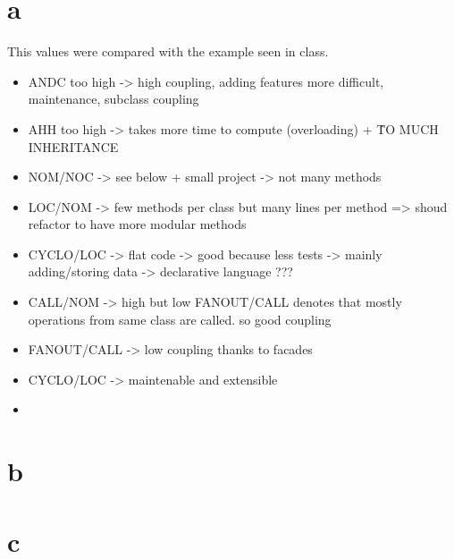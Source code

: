 \section{a}

This values were compared with the example seen in class.

\begin{itemize}
    \item ANDC too high -> high coupling, adding features more difficult, maintenance, subclass coupling
    \item AHH too high -> takes more time to compute (overloading) + \^ TO MUCH INHERITANCE
    \item NOM/NOC -> see below + small project -> not many methods
    \item LOC/NOM -> few methods per class but many lines per method => shoud refactor to have more modular methods
    \item CYCLO/LOC -> flat code -> good because less tests -> mainly adding/storing data -> declarative language ???
    \item CALL/NOM -> high but low FANOUT/CALL denotes that mostly operations from same class are called. so good coupling
    \item FANOUT/CALL -> low coupling thanks to facades
\end{itemize}

\begin{itemize}
    \item CYCLO/LOC -> maintenable and extensible
    \item 
\end{itemize}

\section{b}

\section{c}